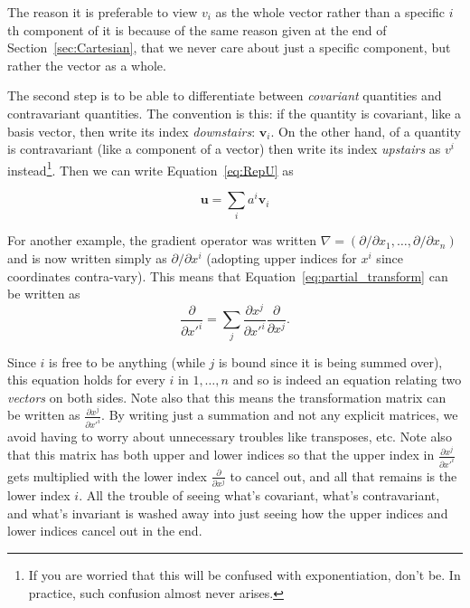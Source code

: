 	The reason it is preferable to view $v_i$ as the whole vector rather than a specific $i$th component of it is because of the same reason given at the end of Section~\ref{sec:Cartesian}, that we never care about just a specific component, but rather the vector as a whole. 
	
	The second step is to be able to differentiate between \emph{covariant} quantities and contravariant quantities. The convention is this: if the quantity is covariant, like a basis vector, then write its index \emph{downstairs}: $\mathbf v_i$. On the other hand, of a quantity is contravariant (like a component of a vector) then write its index \emph{upstairs} as $v^i$ instead\footnote{If you are worried that this will be confused with exponentiation, don't be. In practice, such confusion almost never arises.}. Then we can write Equation~\eqref{eq:RepU} as 
	
	\begin{equation}
		\mathbf u = \sum_{i} a^i \mathbf v_i
	\end{equation}
	
	For another example, the gradient operator was written $\nabla = (\partial/\partial x_1, \dots, \partial/\partial x_n)$ and is now written simply as $\partial/\partial x^i$ (adopting upper indices for $x^i$ since coordinates contra-vary). This means that Equation~\eqref{eq:partial_transform} can be written as
	\begin{equation}\label{eq:partial_transform2}
		\frac{\partial}{\partial {x'}^i} = \sum_{j} \frac{\partial x^j}{\partial {x'}^i} \frac{\partial}{\partial x^j}.
	\end{equation}
	
	Since $i$ is free to be anything (while $j$ is bound since it is being summed over), this equation holds for every $i$ in $1,\dots, n$ and so is indeed an equation relating two \emph{vectors} on both sides. Note also that this means the transformation matrix can be written as $\frac{\partial x^j}{\partial {x'}^i}$. By writing just a summation and not any explicit matrices, we avoid having to worry about unnecessary troubles like transposes, etc. Note also that this matrix has both upper and lower indices so that the upper index in $\frac{\partial x^j}{\partial {x'}^i}$ gets multiplied with the lower index $\frac{\partial}{\partial x^j}$ to cancel out, and all that remains is the lower index $i$. All the trouble of seeing what's covariant, what's contravariant, and what's invariant is washed away into just seeing how the upper indices and lower indices cancel out in the end.
	
